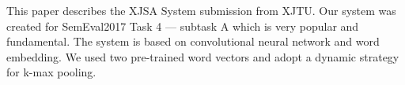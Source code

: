 This paper describes the XJSA System submission from XJTU. Our system was created for SemEval2017 Task 4 --- subtask A which is very popular and fundamental. The system is based on convolutional neural network and word embedding. We used two pre-trained word vectors and adopt a dynamic strategy for k-max pooling.
